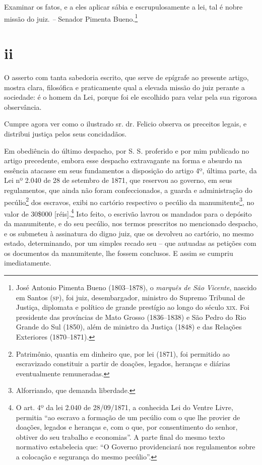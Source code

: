 Examinar os fatos, e a eles aplicar sábia e escrupulosamente a lei, tal
é nobre missão do juiz. \emph{--} Senador Pimenta Bueno.\footnote{ José
  Antonio Pimenta Bueno (1803--1878), o \emph{marquês de São Vicente},
  nascido em Santos (\textsc{sp}), foi juiz, desembargador, ministro do Supremo
  Tribunal de Justiça, diplomata e político de grande prestígio ao longo
  do século \textsc{xix}. Foi presidente das províncias de Mato Grosso
  (1836--1838) e São Pedro do Rio Grande do Sul (1850), além de ministro
  da Justiça (1848) e das Relações Exteriores (1870--1871).}

\section{ii}

O asserto com tanta sabedoria escrito, que serve de epígrafe ao presente
artigo, mostra clara, filosófica e praticamente qual a elevada missão do
juiz perante a sociedade: é o homem da Lei, porque foi ele escolhido
para velar pela sua rigorosa observância.

Cumpre agora ver como o ilustrado sr. dr. Felicio observa os preceitos
legais, e distribui justiça pelos seus concidadãos.

Em obediência do último despacho, por S. S. proferido e por mim
publicado no artigo precedente, embora esse despacho extravagante na
forma e absurdo na essência atacasse em seus fundamentos a disposição do
artigo 4º, última parte, da Lei nº 2.040 de 28 de setembro de 1871, que 
reservou ao governo, em seus regulamentos, que ainda não foram
confeccionados, a guarda e administração do pecúlio\footnote{
  Patrimônio, quantia em dinheiro que, por lei (1871), foi permitido ao
  escravizado constituir a partir de doações, legados, heranças e
  diárias eventualmente remuneradas.} dos escravos, exibi no cartório
respectivo o pecúlio da manumitente\footnote{ Alforriando, que demanda
  liberdade.}, no valor de 30\$000 {[}réis{]}.\footnote{ O art. 4º da
  lei 2.040 de 28/09/1871, a conhecida Lei do Ventre Livre, permitia ``ao
  escravo a formação de um pecúlio com o que lhe provier de doações,
  legados e heranças e, com o que, por consentimento do senhor, obtiver
  do seu trabalho e economias''. A parte final do mesmo texto normativo
  estabelecia que: ``O Governo providenciará nos regulamentos sobre a
  colocação e segurança do mesmo pecúlio''.} Isto feito, o escrivão
lavrou os mandados para o depósito da manumitente, e do seu pecúlio, nos
termos prescritos no mencionado despacho, e os submeteu à assinatura do
digno juiz, que os devolveu ao cartório, no mesmo estado, determinando,
por um simples recado seu -- que autuadas as petições com os documentos
da manumitente, lhe fossem conclusos. E assim se cumpriu
imediatamente.

